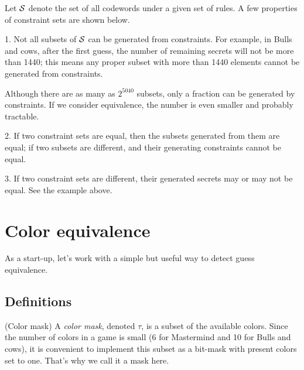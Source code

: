 Let $\mathcal{S}$ denote the set of all codewords under a given set of rules. A few properties of constraint sets are shown below.

1. Not all subsets of $\mathcal{S}$ can be generated from constraints. For example, in Bulls and cows, after the first guess, the number of remaining secrets will not be more than 1440; this means any proper subset with more than 1440 elements cannot be generated from constraints. 

Although there are as many as $2^5040$ subsets, only a fraction can be generated by constraints. If we consider equivalence, the number is even smaller and probably tractable.

2. If two constraint sets are equal, then the subsets generated from them are equal; if two subsets are different, and their generating constraints cannot be equal.

3. If two constraint sets are different, their generated secrets may or may not be equal. See the example above. 
%

\section{Color equivalence}

As a start-up, let's work with a simple but useful way to detect guess equivalence.

\subsection{Definitions}

\begin{definition}
(Color mask) A \emph{color mask}, denoted $\tau$, is a subset of the available colors. Since the number of colors in a game is small (6 for Mastermind and 10 for Bulls and cows), it is convenient to implement this subset as a bit-mask with present colors set to one. That's why we call it a mask here.
\end{definition}

